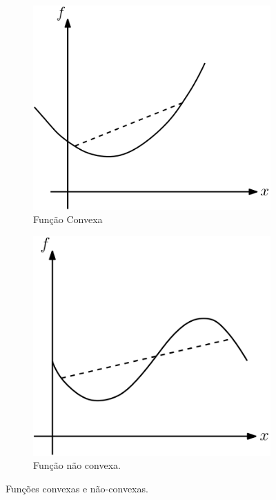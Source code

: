 \documentclass[12pt,a4paper]{scrartcl}
\theoremstyle{definition}%
\begin{document}
\begin{figure}[!ht] 
\centering
\begin{subfigure}[h]{0.42\textwidth}
\centering
\includegraphics[width=\textwidth]{funcao_convexa_1}
\caption{Função Convexa \label{fig:funcao_convexa}}
\end{subfigure}
\begin{subfigure}[!ht]{0.40\textwidth}
	\centering
	\includegraphics[width=\textwidth]{funcao_nao_convexa}
	\caption{Função não convexa. \label{fig:funcao_nao_convexa}}
\end{subfigure}
\caption{Funções convexas e não-convexas. \label{fig:exemplos_funcao_convexa}}
\end{figure}
\end{document}
